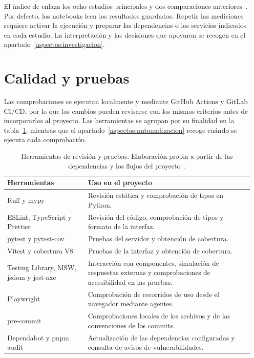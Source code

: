 El índice de  enlaza los ocho estudios principales
y dos comparaciones anteriores~\cite{manualito_benchmarks}. Por defecto,
los notebooks leen los resultados guardados. Repetir las mediciones requiere
activar la ejecución y preparar las dependencias o los servicios indicados
en cada estudio. La interpretación y las decisiones que apoyaron se recogen
en el apartado~\ref{aspectos:investigacion}.

\section{Calidad y pruebas}

Las comprobaciones se ejecutan localmente y mediante GitHub Actions y
GitLab CI/CD, por lo que los cambios pueden revisarse con los mismos
criterios antes de incorporarlos al proyecto. Las herramientas se
agrupan por su finalidad en la tabla~\ref{tabla:herramientas-calidad},
mientras que el apartado~\ref{aspectos:automatizacion} recoge cuándo se
ejecuta cada comprobación.

\begin{table}[htbp]
    \centering
    \small
    \begin{tabular}{@{}>{\raggedright\arraybackslash}p{}>{\raggedright\arraybackslash}p{}@{}}
        \toprule
        \textbf{Herramientas} & \textbf{Uso en el proyecto} \\
        \midrule
        Ruff y mypy & Revisión estática y comprobación de tipos en Python. \\
        \addlinespace
        ESLint, TypeScript y Prettier & Revisión del código, comprobación
        de tipos y formato de la interfaz. \\
        \addlinespace
        pytest y pytest-cov & Pruebas del servidor y obtención de
        cobertura. \\
        \addlinespace
        Vitest y cobertura V8 & Pruebas de la interfaz y obtención de
        cobertura. \\
        \addlinespace
        Testing Library, MSW, jsdom y jest-axe & Interacción con
        componentes, simulación de respuestas externas y comprobaciones
        de accesibilidad en las pruebas. \\
        \addlinespace
        Playwright & Comprobación de recorridos de uso desde el navegador
        mediante agentes. \\
        \addlinespace
        pre-commit & Comprobaciones locales de los archivos y de las
        convenciones de los commits. \\
        \addlinespace
        Dependabot y pnpm audit & Actualización de las dependencias
        configuradas y consulta de avisos de vulnerabilidades. \\
        \bottomrule
    \end{tabular}
    \caption{Herramientas de revisión y pruebas. Elaboración propia a
    partir de las dependencias y los flujos del
    proyecto~\cite{manualito_repositorio,manualito_workflows}.}
    \label{tabla:herramientas-calidad}
\end{table}

